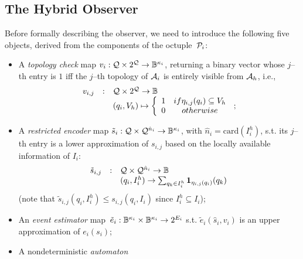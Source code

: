 \documentclass[journal, onecolumn, 12pt]{styles/IEEEtran}
\begin{document}

\subsection{The Hybrid Observer}

Before formally describing the observer, we need to introduce the following five objects, derived from the components of the octuple~$\P_i$:
\begin{itemize}
\item
A {\em topology check} map $v_i : \Q \times 2^\Q \rightarrow
\bool^{\kappa_i}$, returning a binary vector whose $j$--th entry is $1$
iff the $j$--th topology of $\ai$ is entirely visible from $\ah$, i.e.,
\begin{equation*}
\begin{array}{rcl}
v_{i,j} & : & \Q \times 2^\Q \rightarrow \bool \\
& & (q_i, V_h) \mapsto
\left\lbrace
\begin{array}{cc}
1 & \mbox{ if } \eta_{i,j}(q_i) \subseteq V_h \\
0 & \mbox{ otherwise} 
\end{array}
\right.
\, ;
\end{array}
\end{equation*}
\item
A {\em restricted encoder} map $\tilde{s}_i : \Q \times \Q^{\hat{n}_i}
\rightarrow \bool^{\kappa_i}$, with $\hat{n}_i=\mbox{card}(I_i^h)$,
s.t. its $j$--th entry is a lower approximation of $s_{i,j}$ based on
the locally available information of $I_i$:
\begin{equation*}
\begin{array}{rcl}
\tilde{s}_{i,j} & : & \Q \times \Q^{\hat{n}_i} \rightarrow \bool \\
& & (q_i, I_i^h) \rightarrow \sum_{q_k \in I_i^h} {\bf 1}_{\eta_{i,j}(q_i)}(q_k)
\end{array}
\, 
\end{equation*}
(note that $\tilde{s}_{i,j}(q_i, I_i^h) \leq s_{i,j}(q_i, I_i)$ since $I_i^h \subseteq I_i$);
\item An {\em event estimator} map~$\tilde{e}_i : \bool^{\kappa_i} \times \bool^{\kappa_i} \rightarrow 2^{E_i}$ s.t. $\tilde{e}_i(\hat{s}_i, v_i)$ is an upper approximation of 
$e_i(s_i)$;
\item 
A nondeterministic {\em automaton}

\end{itemize}
\end{document}
